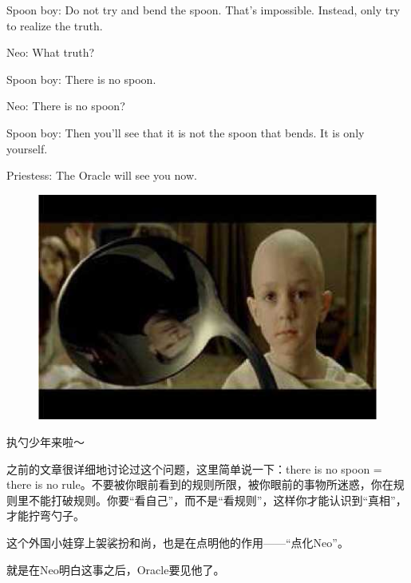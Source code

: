 \documentclass[UTF8]{ctexart}
\newenvironment{myquote}{\color{green} \setlength{\leftskip}{6em} \setlength{\rightskip}{4em} \setlength{\parindent}{-2em}}{\par}
\begin{document}
\begin{myquote}
Spoon boy: Do not try and bend the spoon. That's impossible. Instead, only try to realize the truth.

Neo: What truth?

Spoon boy: There is no spoon.

Neo: There is no spoon?

Spoon boy: Then you'll see that it is not the spoon that bends. It is only yourself.

Priestess: The Oracle will see you now.
\end{myquote}

\begin{figure}[htb]
\centering
\includegraphics[width=0.5\linewidth]{fig/read_Matrix-45}
\end{figure}

执勺少年来啦～

之前的文章很详细地讨论过这个问题，这里简单说一下：there is no spoon = there is no rule。不要被你眼前看到的规则所限，被你眼前的事物所迷惑，你在规则里不能打破规则。你要“看自己”，而不是“看规则”，这样你才能认识到“真相”，才能拧弯勺子。

这个外国小娃穿上袈裟扮和尚，也是在点明他的作用——“点化Neo”。

就是在Neo明白这事之后，Oracle要见他了。
\end{document}
